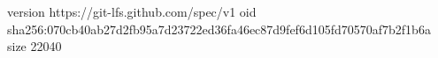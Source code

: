 version https://git-lfs.github.com/spec/v1
oid sha256:070cb40ab27d2fb95a7d23722ed36fa46ec87d9fef6d105fd70570af7b2f1b6a
size 22040
